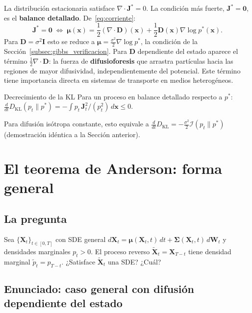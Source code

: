 La distribución estacionaria satisface $\nabla\cdot\bm{J}^* = 0$. La condición
más fuerte, $\bm{J}^* = \bm{0}$, es el \textbf{balance detallado}. De~\eqref{eq:corriente}:
\begin{equation}
  \bm{J}^* = \bm{0}
  \;\Leftrightarrow\;
  \bm{\mu}(\bm{x}) = \frac{1}{2}(\nabla\cdot\bm{D})(\bm{x})
  + \frac{1}{2}\bm{D}(\bm{x})\nabla\log p^*(\bm{x}).
  \label{eq:balance_general}
\end{equation}
Para $\bm{D} = \sigma^2\bm{I}$ esto se reduce a $\bm{\mu} = \frac{\sigma^2}{2}
\nabla\log p^*$, la condición de la Sección~\ref{subsec:gibbs_verificacion}. Para $\bm{D}$
dependiente del estado aparece el término $\frac{1}{2}\nabla\cdot\bm{D}$:
la fuerza de \textbf{difusioforesis} que arrastra partículas hacia las regiones
de mayor difusividad, independientemente del potencial. Este término tiene
importancia directa en sistemas de transporte en medios heterogéneos.

\begin{proposicion}{Decrecimiento de la KL}
\label{prop:kl_decrece}
Para un proceso en balance detallado respecto a $p^*$:
$\frac{d}{dt}D_{\mathrm{KL}}(p_t\|p^*) = -\int p_t\,
\bm{J}_t^2/(p_t^2)\,d\bm{x} \leq 0$.
\end{proposicion}

Para difusión isótropa constante, esto equivale a
$\frac{d}{dt}D_{\mathrm{KL}} = -\frac{\sigma^2}{2}\mathcal{I}(p_t\|p^*)$
(demostración idéntica a la Sección anterior).

\section{El teorema de Anderson: forma general}
\label{sec:anderson}

\subsection{La pregunta}
\label{subsec:reverso_pregunta}

Sea $\{\bm{X}_t\}_{t\in[0,T]}$ con SDE general $d\bm{X}_t =
\bm{\mu}(\bm{X}_t,t)\,dt + \bm{\Sigma}(\bm{X}_t,t)\,d\bm{W}_t$ y densidades
marginales $p_t > 0$. El proceso reverso $\tilde{\bm{X}}_t = \bm{X}_{T-t}$
tiene densidad marginal $\tilde{p}_t = p_{T-t}$. ¿Satisface $\tilde{\bm{X}}_t$
una SDE? ¿Cuál?

\subsection{Enunciado: caso general con difusión dependiente del estado}
\label{subsec:anderson_general}

